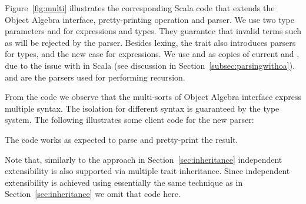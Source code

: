 Figure~\ref{fig:multi} illustrates the corresponding Scala code
that extends the Object Algebra interface, pretty-printing operation and parser. We use two type parameters  and  for expressions and types. They guarantee that invalid terms such as  will be rejected by the parser.
Besides lexing, the trait  also introduces parsers for types, and the new case for expressions.
We use  and  as copies of current  and , due to the issue
with  in Scala (see discussion in Section~\ref{subsec:parsingwithoa}).  and  are the parsers used for performing recursion.

From the code we observe that the multi-sorts of Object Algebra interface
express multiple syntax. The isolation for different syntax
is guaranteed by the type system. The following illustrates some client code
for the new parser:

The code works as expected to parse and pretty-print the result.

Note that, similarly to the approach in Section~\ref{sec:inheritance} independent extensibility is also supported via multiple trait inheritance.
Since independent extensibility is achieved using essentially the same technique as in Section~\ref{sec:inheritance} we omit that code here.
